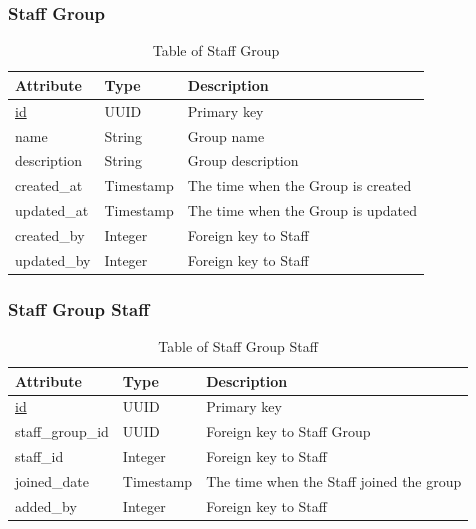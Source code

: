 \subsubsection{Staff Group}
\begin{table}[H]
    \centering
    \begin{tabular}{|p{3cm}|p{2cm}|p{\dimexpr\textwidth-6.8cm}|} %
        \hline
        \rowcolor[HTML]{C0C0C0} 
        \textbf{Attribute} & \textbf{Type} & \textbf{Description} \\ \hline
        \underline{id} & UUID & Primary key \\ \hline
        name & String & Group name \\ \hline
        description & String & Group description \\ \hline
        created\_at & Timestamp & The time when the Group is created \\ \hline
        updated\_at & Timestamp & The time when the Group is updated \\ \hline
        created\_by & Integer & Foreign key to Staff \\ \hline
        updated\_by & Integer & Foreign key to Staff \\ \hline
    \end{tabular}
    \caption{Table of Staff Group}
    \label{tab:staff-group-table}
\end{table}

\subsubsection{Staff Group Staff}
\begin{table}[H]
    \centering
    \begin{tabular}{|p{3cm}|p{2cm}|p{\dimexpr\textwidth-6.8cm}|} %
        \hline
        \rowcolor[HTML]{C0C0C0} 
        \textbf{Attribute} & \textbf{Type} & \textbf{Description} \\ \hline
        \underline{id} & UUID & Primary key \\ \hline
        staff\_group\_id & UUID & Foreign key to Staff Group \\ \hline
        staff\_id & Integer & Foreign key to Staff \\ \hline
        joined\_date & Timestamp & The time when the Staff joined the group \\ \hline
        added\_by & Integer & Foreign key to Staff \\ \hline
    \end{tabular}
    \caption{Table of Staff Group Staff}
    \label{tab:staff-group-staff-table}
\end{table}

